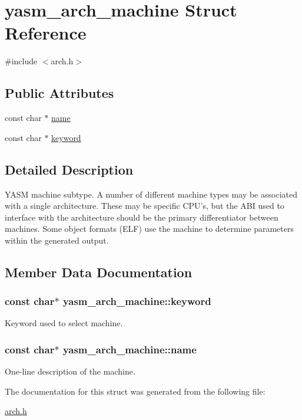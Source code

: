 \hypertarget{structyasm__arch__machine}{\section{yasm\-\_\-arch\-\_\-machine Struct Reference}
\label{structyasm__arch__machine}
}


{\ttfamily \#include $<$arch.\-h$>$}

\subsection*{Public Attributes}
\begin{DoxyCompactItemize}
\item 
const char $\ast$ \hyperlink{structyasm__arch__machine_ac0acb3e135472ac0a5c34adbfe783642}{name}
\item 
const char $\ast$ \hyperlink{structyasm__arch__machine_ac92d1f1fa42d0c38e7a98cf8409b9c3c}{keyword}
\end{DoxyCompactItemize}


\subsection{Detailed Description}
Y\-A\-S\-M machine subtype. A number of different machine types may be associated with a single architecture. These may be specific C\-P\-U's, but the A\-B\-I used to interface with the architecture should be the primary differentiator between machines. Some object formats (E\-L\-F) use the machine to determine parameters within the generated output. 

\subsection{Member Data Documentation}
\hypertarget{structyasm__arch__machine_ac92d1f1fa42d0c38e7a98cf8409b9c3c}{
\subsubsection[{keyword}]{\setlength{\rightskip}{0pt plus 5cm}const char$\ast$ yasm\-\_\-arch\-\_\-machine\-::keyword}}\label{structyasm__arch__machine_ac92d1f1fa42d0c38e7a98cf8409b9c3c}
Keyword used to select machine. \hypertarget{structyasm__arch__machine_ac0acb3e135472ac0a5c34adbfe783642}{
\subsubsection[{name}]{\setlength{\rightskip}{0pt plus 5cm}const char$\ast$ yasm\-\_\-arch\-\_\-machine\-::name}}\label{structyasm__arch__machine_ac0acb3e135472ac0a5c34adbfe783642}
One-\/line description of the machine. 

The documentation for this struct was generated from the following file\-:\begin{DoxyCompactItemize}
\item 
\hyperlink{arch_8h}{arch.\-h}\end{DoxyCompactItemize}
